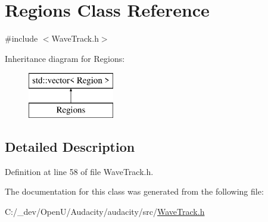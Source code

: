 \hypertarget{class_regions}{}\section{Regions Class Reference}
\label{class_regions}


{\ttfamily \#include $<$Wave\+Track.\+h$>$}

Inheritance diagram for Regions\+:\begin{figure}[H]
\begin{center}
\leavevmode
\includegraphics[height=2.000000cm]{class_regions}
\end{center}
\end{figure}


\subsection{Detailed Description}


Definition at line 58 of file Wave\+Track.\+h.



The documentation for this class was generated from the following file\+:\begin{DoxyCompactItemize}
\item 
C\+:/\+\_\+dev/\+Open\+U/\+Audacity/audacity/src/\hyperlink{_wave_track_8h}{Wave\+Track.\+h}\end{DoxyCompactItemize}
